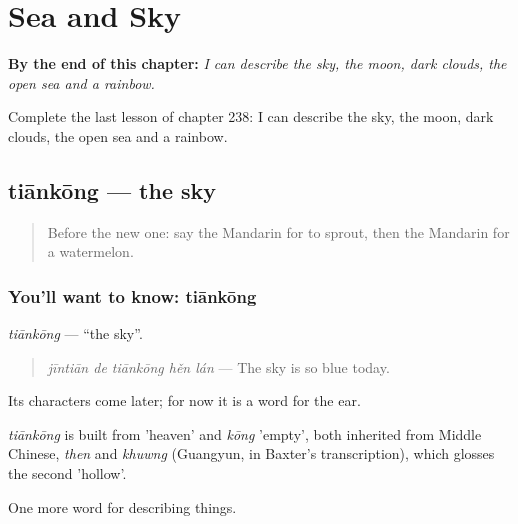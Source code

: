
\chapter{Sea and Sky}
\label{ch:zh-sea-and-sky}

\begin{chapteropening}
\textbf{By the end of this chapter:} \emph{I can describe the sky, the moon, dark clouds, the open sea and a rainbow.}

Complete the last lesson of chapter 238: I can describe the sky, the moon, dark clouds, the open sea and a rainbow.
\end{chapteropening}

\section[tiānkōng]{tiānkōng — the sky}

\label{lesson:ZH-C238-tiankong}



\begin{quote}
Before the new one: say the Mandarin for to sprout, then the Mandarin for a watermelon.
\end{quote}

\subsection*{You'll want to know: tiānkōng}
\emph{tiānkōng} — \textquotedblleft{}the sky\textquotedblright{}.

\begin{quote}
\emph{jīntiān de tiānkōng hěn lán} — The sky is so blue today.
\end{quote}

Its characters come later; for now it is a word for the ear.

\begin{cousinweb}
\emph{tiānkōng} is built from  'heaven' and \emph{kōng} 'empty', both inherited from Middle Chinese, \emph{then} and \emph{khuwng} (Guangyun, in Baxter's transcription), which glosses the second 'hollow'.
\end{cousinweb}

\begin{grammarlens}[title={What you've built}]
One more word for describing things.
\end{grammarlens}

